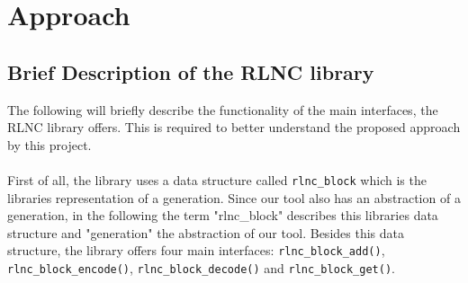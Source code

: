 \documentclass[a4paper,english,10pt]{tumarticle}
\begin{document}
\section{Approach}\label{app}

\subsection{Brief Description of the RLNC library}\label{app:desc}
The following will briefly describe the functionality of the main interfaces, the RLNC library offers.
This is required to better understand the proposed approach by this project.
\\\\
First of all, the library uses a data structure called \texttt{rlnc\_block} which is the libraries representation of a generation.
Since our tool also has an abstraction of a generation, in the following the term "rlnc\_block" describes this libraries data structure and 
"generation" the abstraction of our tool. Besides this data structure, the library offers four main interfaces: 
\texttt{rlnc\_block\_add()}, \texttt{rlnc\_block\_encode()}, \texttt{rlnc\_block\_decode()} and \texttt{rlnc\_block\_get()}.
\end{document}
